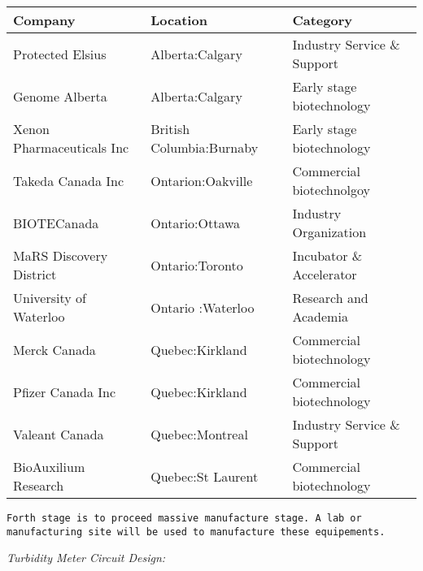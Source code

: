\documentclass[]{article}
\begin{document}
\begin{longtable}[]{@{}lll@{}}
\toprule
Company & Location & Category\tabularnewline
\midrule
\endhead
Protected Elsius & Alberta:Calgary & Industry Service \&
Support\tabularnewline
Genome Alberta & Alberta:Calgary & Early stage
biotechnology\tabularnewline
Xenon Pharmaceuticals Inc & British Columbia:Burnaby & Early stage
biotechnology\tabularnewline
Takeda Canada Inc & Ontarion:Oakville & Commercial
biotechnolgoy\tabularnewline
BIOTECanada & Ontario:Ottawa & Industry Organization\tabularnewline
MaRS Discovery District & Ontario:Toronto & Incubator \&
Accelerator\tabularnewline
University of Waterloo & Ontario :Waterloo & Research and
Academia\tabularnewline
Merck Canada & Quebec:Kirkland & Commercial biotechnology\tabularnewline
Pfizer Canada Inc & Quebec:Kirkland & Commercial
biotechnology\tabularnewline
Valeant Canada & Quebec:Montreal & Industry Service \&
Support\tabularnewline
BioAuxilium Research & Quebec:St Laurent & Commercial
biotechnology\tabularnewline
\bottomrule
\end{longtable}

\begin{verbatim}
Forth stage is to proceed massive manufacture stage. A lab or manufacturing site will be used to manufacture these equipements. 
\end{verbatim}

\emph{Turbidity Meter Circuit Design:}
\end{document}
